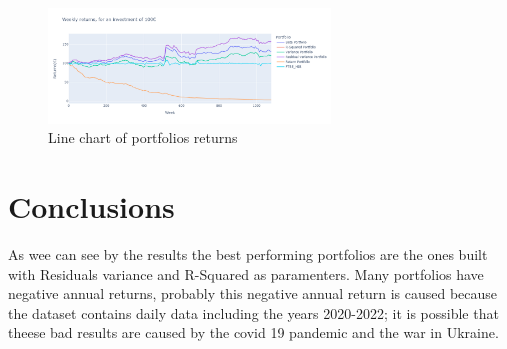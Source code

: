 \documentclass[12pt, a4paper, twocolumn]{article} %
\begin{document}
		\begin{figure}[H]
			\caption{Line chart of portfolios returns}
			\begin{center}
				\includegraphics[width=75mm,scale=1]{port_ret_complete_small.png}
			\end{center}
		\end{figure}

	\section{Conclusions}
	As wee can see by the results the best performing portfolios are the ones built with Residuals variance and R-Squared as paramenters. Many portfolios have negative annual returns, probably this negative annual return is caused because the dataset contains daily data including the years 2020-2022; it is possible that theese bad results are caused by the covid 19 pandemic and the war in Ukraine.
\nocite{*} %
\printbibliography[title={Bibliography}] %
\end{document}
